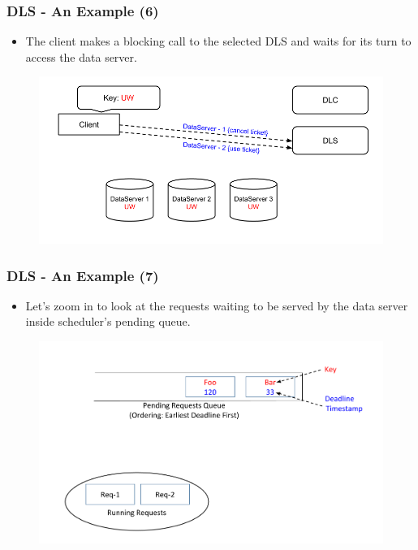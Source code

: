 \documentclass{beamer}
\begin{document}
\begin{frame}
  \frametitle{DLS - An Example (6)}
  \begin{itemize}
  \item The client makes a blocking call to the selected DLS and waits for
    its turn to access the data server.
  \end{itemize}
  \begin{figure}
    \begin{center}
      \centerline{\includegraphics[scale=0.40]{img/DLS_Example06.png}}
    \end{center}
  \end{figure}
\end{frame}

\begin{frame}
  \frametitle{DLS - An Example (7)}
  \begin{itemize}
  \item Let's zoom in to look at the requests waiting to be served by the data
    server inside scheduler's pending queue.
    \newline
  \end{itemize}
  \vspace{-5 mm}
  \begin{figure}
    \begin{center}
      \centerline{\includegraphics[scale=0.33]{img/DLS_Example_ZOOM_1.png}}
    \end{center}
  \end{figure}
\end{frame}
\end{document}
